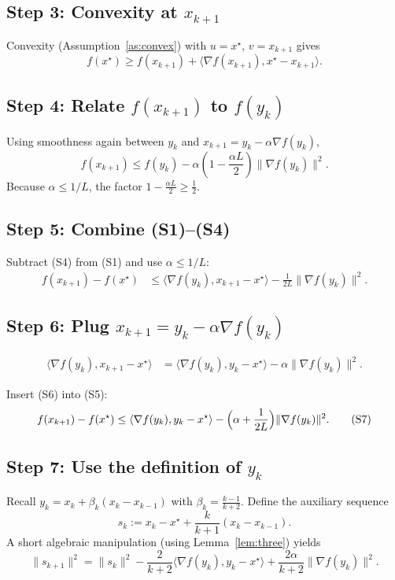 \documentclass[11pt]{article}
\begin{document}
\subsection*{Step 3: Convexity at $x_{k+1}$}
Convexity (Assumption~\ref{as:convex}) with $u=x^\star$, $v=x_{k+1}$ gives
\[
f(x^\star) \ge f(x_{k+1}) + \langle\nabla f(x_{k+1}),x^\star-x_{k+1}\rangle . \tag{S3}
\]

\subsection*{Step 4: Relate $f(x_{k+1})$ to $f(y_k)$}
Using smoothness again between $y_k$ and $x_{k+1}=y_k-\alpha\nabla f(y_k)$,
\[
f(x_{k+1}) \le f(y_k) - \alpha\!\left(1-\frac{\alpha L}{2}\right)\!\|\nabla f(y_k)\|^2 .
\tag{S4}
\]
Because $\alpha\le 1/L$, the factor $1-\frac{\alpha L}{2}\ge \frac12$.

\subsection*{Step 5: Combine (S1)–(S4)}
Subtract (S4) from (S1) and use $\alpha\le1/L$:
\[
\begin{aligned}
f(x_{k+1})-f(x^\star)
&\le \langle\nabla f(y_k),x_{k+1}-x^\star\rangle
   -\frac{1}{2L}\|\nabla f(y_k)\|^2 .
\end{aligned}
\tag{S5}
\]

\subsection*{Step 6: Plug $x_{k+1}=y_k-\alpha\nabla f(y_k)$}
\[
\begin{aligned}
\langle\nabla f(y_k),x_{k+1}-x^\star\rangle
&= \langle\nabla f(y_k),y_k-x^\star\rangle -\alpha\|\nabla f(y_k)\|^2 .
\end{aligned}
\tag{S6}
\]

Insert (S6) into (S5):
\[
f(x_{k+1})-f(x^\star)
\le \langle\nabla f(y_k),y_k-x^\star\rangle
      -\Bigl(\alpha+\frac{1}{2L}\Bigr)\|\nabla f(y_k)\|^2 .
\tag{S7}
\]

\subsection*{Step 7: Use the definition of $y_k$}
Recall $y_k = x_k + \beta_k (x_k-x_{k-1})$ with $\beta_k = \frac{k-1}{k+2}$.  
Define the auxiliary sequence
\[
s_k := x_k - x^\star + \frac{k}{k+1}(x_k-x_{k-1}). \tag{S8}
\]
A short algebraic manipulation (using Lemma~\ref{lem:three}) yields
\[
\|s_{k+1}\|^2 = \|s_k\|^2 - \frac{2}{k+2}\langle\nabla f(y_k),y_k-x^\star\rangle
               +\frac{2\alpha}{k+2}\|\nabla f(y_k)\|^2 .
\tag{S9}
\]
\end{document}

